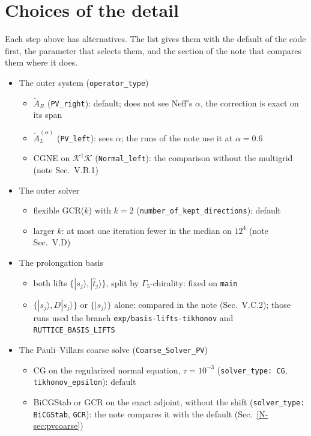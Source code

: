 \documentclass[11pt,a4paper]{article}
\numberwithin{equation}{section}
\newcommand{\dg}{^{\dagger}}
\newcommand{\Gfive}{\Gamma_5}
\newcommand{\AR}{\tilde A_{R}}
\newcommand{\AL}{\tilde A_{L}}
\newcommand{\code}[1]{\texttt{\small #1}}
\begin{document}
\section{Choices of the detail}
\label{sec:choices}
Each step above has alternatives. The list gives them with the default of the code first, the
parameter that selects them, and the section of the note that compares them where it does.
\begin{itemize}
\item The outer system (\code{operator\_type})
  \begin{itemize}
  \item $\AR$ (\code{PV\_right}): default; does not see Neff's $\alpha$, the correction is exact on its span
  \item $\AL^{(\alpha)}$ (\code{PV\_left}): sees $\alpha$; the runs of the note use it at $\alpha=0.6$
  \item CGNE on $\mathcal K\dg\mathcal K$ (\code{Normal\_left}): the comparison without the multigrid (note Sec.~V.B.1)
  \end{itemize}
\item The outer solver
  \begin{itemize}
  \item flexible GCR($k$) with $k=2$ (\code{number\_of\_kept\_directions}): default
  \item larger $k$: at most one iteration fewer in the median on $12^4$ (note Sec.~V.D)
  \end{itemize}
\item The prolongation basis
  \begin{itemize}
  \item both lifts $\{|s_j\rangle,|\hat t_j\rangle\}$, split by $\Gfive$-chirality: fixed on \code{main}
  \item $\{|s_j\rangle,D|s_j\rangle\}$ or $\{|s_j\rangle\}$ alone: compared in the note (Sec.~V.C.2); those runs used the branch \code{exp/\allowbreak basis-\allowbreak lifts-\allowbreak tikhonov} and \code{RUTTICE\_BASIS\_LIFTS}
  \end{itemize}
\item The Pauli--Villars coarse solve (\code{Coarse\_Solver\_PV})
  \begin{itemize}
  \item CG on the regularized normal equation, $\tau=10^{-3}$ (\code{solver\_type: CG}, \code{tikhonov\_epsilon}): default
  \item BiCGStab or GCR on the exact adjoint, without the shift (\code{solver\_type: BiCGStab}, \code{GCR}): the note compares it with the default (Sec.~\ref{N-sec:pvcoarse})

\end{itemize}
\end{itemize}
\end{document}
